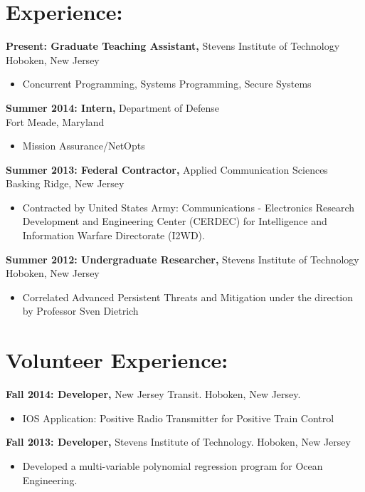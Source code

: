 \documentclass[mm]{res}
\begin{document}
\begin{resume}
\section{Experience:}
{\bf Present: Graduate Teaching Assistant,} Stevens Institute of Technology \\
Hoboken, New Jersey
 \begin{itemize}
 \item Concurrent Programming, Systems Programming, Secure Systems

 \end{itemize}
 
 {\bf Summer 2014: Intern,} Department of Defense \\
 Fort Meade, Maryland
 \begin{itemize}
 \item Mission Assurance/NetOpts
 \end{itemize}
  
 {\bf Summer 2013: Federal Contractor,} Applied Communication Sciences \\  
 Basking Ridge, New Jersey 
 \begin{itemize}
 \item Contracted by United States Army: Communications - Electronics Research \\ Development and Engineering Center (CERDEC) for Intelligence and Information Warfare Directorate (I2WD).
 \end{itemize}
 
{\bf Summer 2012: Undergraduate Researcher,} Stevens Institute of Technology \\
Hoboken, New Jersey 
\begin{itemize}
\item Correlated Advanced Persistent Threats and Mitigation under the direction by Professor Sven Dietrich
\end{itemize}

\section{Volunteer Experience:} 
  			{\bf Fall 2014: Developer,} New Jersey Transit. Hoboken, New Jersey.
            \begin{itemize} 
            \item IOS Application: Positive Radio Transmitter for Positive Train Control 
            \end{itemize}
            {\bf Fall 2013: Developer,} Stevens Institute of Technology. Hoboken, New Jersey
            \begin{itemize} 
            \item Developed a multi-variable polynomial regression program for Ocean Engineering.
            \end{itemize}
                

\end{resume}
\end{document}

